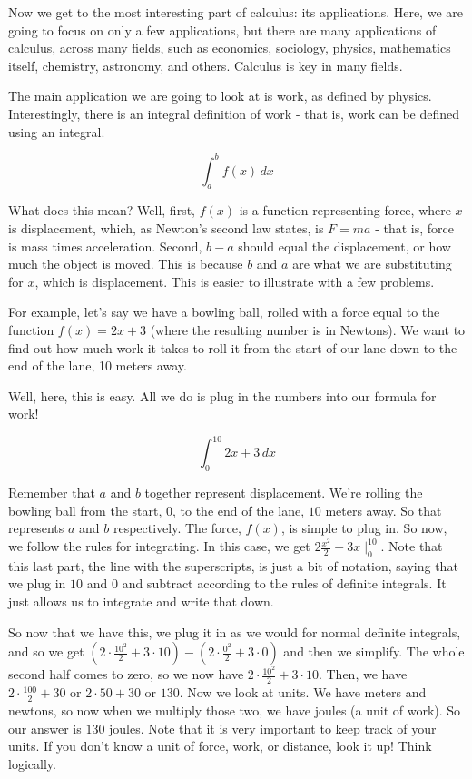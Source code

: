 Now we get to the most interesting part of calculus: its applications. 
Here, we are going to focus on only a few applications, but there are many applications of calculus, across many fields, such as economics, sociology, physics, mathematics itself, chemistry, astronomy, and others. 
Calculus is key in many fields.

The main application we are going to look at is work, as defined by physics. 
Interestingly, there is an integral definition of work - that is, work can be defined using an integral.

\begin{equation*}
    \int^b_a f(x) \, dx
\end{equation*}

What does this mean? 
Well, first, $f(x)$ is a function representing force, where $x$ is displacement, which, as Newton's second law states, is $F = ma$ - that is, force is mass times acceleration. 
Second, $b - a$ should equal the displacement, or how much the object is moved. This is because $b$ and $a$ are what we are substituting for $x$, which is displacement.
This is easier to illustrate with a few problems.

For example, let's say we have a bowling ball, rolled with a force equal to the function $f(x) = 2x+3$ (where the resulting number is in Newtons). 
We want to find out how much work it takes to roll it from the start of our lane down to the end of the lane, 10 meters away.

Well, here, this is easy. All we do is plug in the numbers into our formula for work! 

\begin{equation*}
    \int^{10}_0 2x+3 \, dx
\end{equation*}

Remember that $a$ and $b$ together represent displacement. 
We're rolling the bowling ball from the start, $0$, to the end of the lane, $10$ meters away. 
So that represents $a$ and $b$ respectively. 
The force, $f(x)$, is simple to plug in. 
So now, we follow the rules for integrating. 
In this case, we get $2\frac{x^2}{2}+3x\mid^{10}_0$. 
Note that this last part, the line with the superscripts, is just a bit of notation, saying that we plug in $10$ and $0$ and subtract according to the rules of definite integrals. 
It just allows us to integrate and write that down. 

So now that we have this, we plug it in as we would for normal definite integrals, and so we get $(2\cdot\frac{10^2}{2}+3\cdot 10) - (2\cdot\frac{0^2}{2}+3\cdot 0)$ and then we simplify. 
The whole second half comes to zero, so we now have $2\cdot\frac{10^2}{2}+3\cdot 10$. 
Then, we have $2\cdot \frac{100}{2}+ 30$ or $2\cdot 50 + 30$ or $130$. 
Now we look at units. 
We have meters and newtons, so now when we multiply those two, we have joules (a unit of work). 
So our answer is $130$ joules. 
Note that it is very important to keep track of your units. If you don't know a unit of force, work, or distance, look it up! Think logically.

